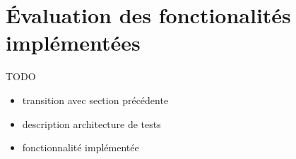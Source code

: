 \section{Évaluation des fonctionalités implémentées}
\label{section:evaluation}
{\color{red} TODO}

\begin{itemize}
\item transition avec section précédente
\item description architecture de tests
\item fonctionnalité implémentée
\end{itemize}

